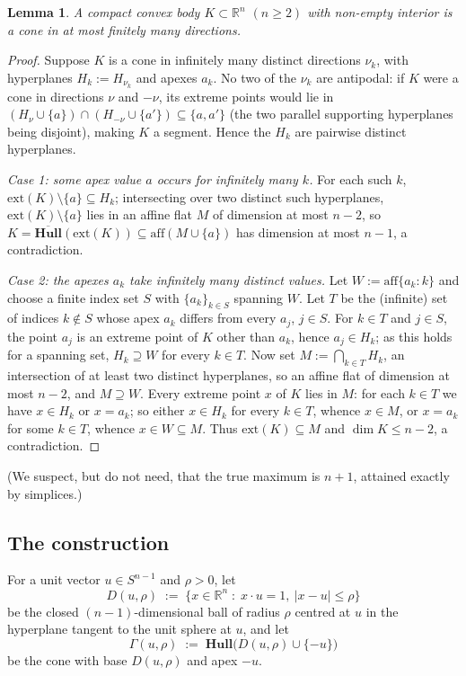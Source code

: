 \documentclass[12pt]{article}
\newtheorem{lemma}[theorem]{Lemma}
\theoremstyle{definition}
\newcommand{\R}{\mathbb{R}}
\newcommand{\Sph}{S^{n-1}}
\newcommand{\Hull}{\mathbf{Hull}}
\newcommand{\ext}{\mathrm{ext}}
\newcommand{\aff}{\mathrm{aff}}
\begin{document}
\begin{lemma}\label{lem:conedirections}
A compact convex body $K\subset\R^n$ $(n\ge 2)$ with non-empty interior
is a cone in at most finitely many directions.
\end{lemma}

\begin{proof}
Suppose $K$ is a cone in infinitely many distinct directions $\nu_k$,
with hyperplanes $H_k:=H_{\nu_k}$ and apexes $a_k$.  No two of the
$\nu_k$ are antipodal: if $K$ were a cone in directions $\nu$ and
$-\nu$, its extreme points would lie in
$(H_{\nu}\cup\{a\})\cap(H_{-\nu}\cup\{a'\})\subseteq\{a,a'\}$ (the two
parallel supporting hyperplanes being disjoint), making $K$ a segment.
Hence the $H_k$ are pairwise distinct hyperplanes.

{\em Case 1: some apex value $a$ occurs for infinitely many $k$.}  For
each such $k$, $\ext(K)\setminus\{a\}\subseteq H_k$; intersecting over
two distinct such hyperplanes, $\ext(K)\setminus\{a\}$ lies in an affine
flat $M$ of dimension at most $n-2$, so
$K=\overline{\Hull}(\ext(K))\subseteq\aff(M\cup\{a\})$ has dimension at
most $n-1$, a contradiction.

{\em Case 2: the apexes $a_k$ take infinitely many distinct values.}
Let $W:=\aff\{a_k : k\}$ and choose a finite index set $S$ with
$\{a_k\}_{k\in S}$ spanning $W$.  Let $T$ be the (infinite) set of
indices $k\notin S$ whose apex $a_k$ differs from every $a_j$,
$j\in S$.  For $k\in T$ and $j\in S$, the point $a_j$ is an extreme
point of $K$ other than $a_k$, hence $a_j\in H_k$; as this holds for a
spanning set, $H_k\supseteq W$ for every $k\in T$.  Now set
$M:=\bigcap_{k\in T}H_k$, an intersection of at least two distinct
hyperplanes, so an affine flat of dimension at most $n-2$, and
$M\supseteq W$.  Every extreme point $x$ of $K$ lies in $M$: for each $k\in T$ we have
$x\in H_k$ or $x=a_k$; so either $x\in H_k$ for every $k\in T$, whence
$x\in M$, or $x=a_k$ for some $k\in T$, whence
$x\in W\subseteq M$.  Thus
$\ext(K)\subseteq M$ and $\dim K\le n-2$, a contradiction.
\end{proof}

(We suspect, but do not need, that the true maximum is $n+1$, attained
exactly by simplices.)

\subsection{The construction}

For a unit vector $u\in\Sph$ and $\rho>0$, let
\[
  D(u,\rho)\;:=\;\{x\in\R^n\;:\;x\cdot u=1,\ |x-u|\le\rho\}
\]
be the closed $(n-1)$-dimensional ball of radius $\rho$ centred at $u$ in the
hyperplane tangent to the unit sphere at $u$, and let
\[
  \Gamma(u,\rho)\;:=\;\Hull\bigl(D(u,\rho)\cup\{-u\}\bigr)
\]
be the cone with base $D(u,\rho)$ and apex $-u$.
\end{document}
